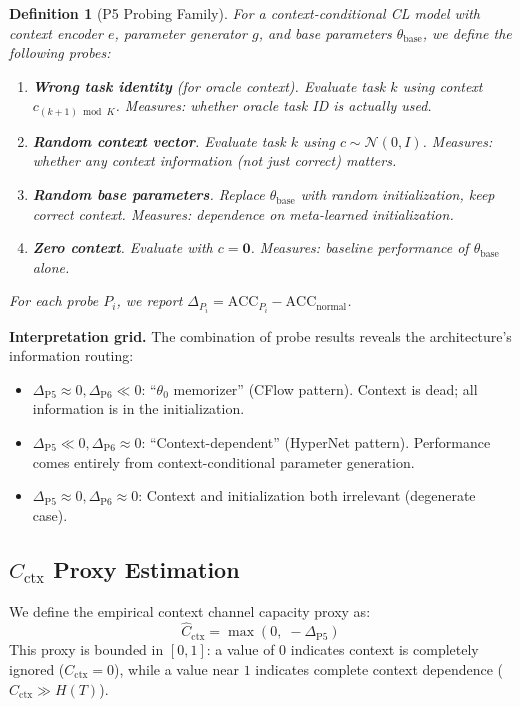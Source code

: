 \documentclass{article}
\newtheorem{definition}{Definition}
\begin{document}
\begin{definition}[P5 Probing Family]
\label{def:p5_family}
For a context-conditional CL model with context encoder $e$, parameter generator $g$, and base parameters $\theta_\mathrm{base}$, we define the following probes:
\begin{enumerate}
    \item[\textbf{P5a}:] \textbf{Wrong task identity} (for oracle context). Evaluate task $k$ using context $c_{(k+1)\bmod K}$. Measures: whether oracle task ID is actually used.
    \item[\textbf{P5b}:] \textbf{Random context vector}. Evaluate task $k$ using $c \sim \mathcal{N}(0, I)$. Measures: whether \emph{any} context information (not just correct) matters.
    \item[\textbf{P6}:] \textbf{Random base parameters}. Replace $\theta_\mathrm{base}$ with random initialization, keep correct context. Measures: dependence on meta-learned initialization.
    \item[\textbf{P7}:] \textbf{Zero context}. Evaluate with $c = \mathbf{0}$. Measures: baseline performance of $\theta_\mathrm{base}$ alone.
\end{enumerate}
For each probe $P_i$, we report $\Delta_{P_i} = \mathrm{ACC}_{P_i} - \mathrm{ACC}_\mathrm{normal}$.
\end{definition}

\textbf{Interpretation grid.} The combination of probe results reveals the architecture's information routing:
\begin{itemize}
    \item $\Delta_\mathrm{P5} \approx 0, \Delta_\mathrm{P6} \ll 0$: ``$\theta_0$ memorizer'' (CFlow pattern). Context is dead; all information is in the initialization.
    \item $\Delta_\mathrm{P5} \ll 0, \Delta_\mathrm{P6} \approx 0$: ``Context-dependent'' (HyperNet pattern). Performance comes entirely from context-conditional parameter generation.
    \item $\Delta_\mathrm{P5} \approx 0, \Delta_\mathrm{P6} \approx 0$: Context and initialization both irrelevant (degenerate case).
\end{itemize}

\subsection{$C_\mathrm{ctx}$ Proxy Estimation}

We define the empirical context channel capacity proxy as:
\begin{equation}
    \hat{C}_\mathrm{ctx} = \max(0,\; -\Delta_\mathrm{P5})
\end{equation}
This proxy is bounded in $[0, 1]$: a value of $0$ indicates context is completely ignored ($C_\mathrm{ctx} = 0$), while a value near $1$ indicates complete context dependence ($C_\mathrm{ctx} \gg H(T)$).
\end{document}
